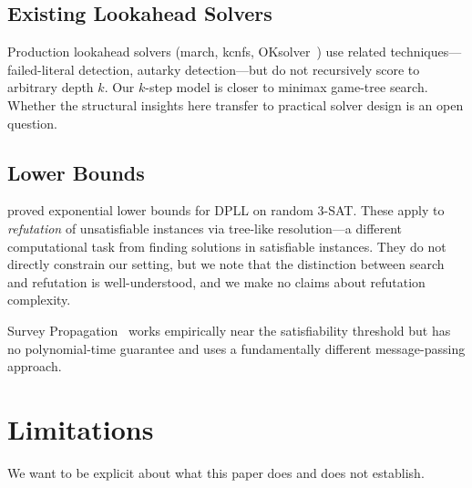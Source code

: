\documentclass[11pt,a4paper]{article}
\begin{document}
\subsection{Existing Lookahead Solvers}

Production lookahead solvers (march, kcnfs, OKsolver~\citep{heule2009lookahead}) use related techniques---failed-literal detection, autarky detection---but do not recursively score to arbitrary depth $k$. Our $k$-step model is closer to minimax game-tree search. Whether the structural insights here transfer to practical solver design is an open question.

\subsection{Lower Bounds}

\citet{alekhnovich2011lower} proved exponential lower bounds for DPLL on random 3-SAT. These apply to \emph{refutation} of unsatisfiable instances via tree-like resolution---a different computational task from finding solutions in satisfiable instances. They do not directly constrain our setting, but we note that the distinction between search and refutation is well-understood, and we make no claims about refutation complexity.

Survey Propagation~\citep{mezard2002random} works empirically near the satisfiability threshold but has no polynomial-time guarantee and uses a fundamentally different message-passing approach.

\section{Limitations}\label{sec:limitations}

We want to be explicit about what this paper does and does not establish.
\end{document}
